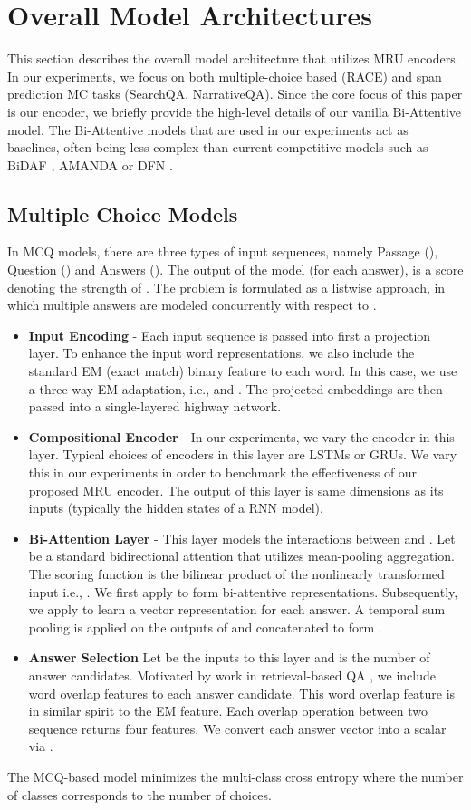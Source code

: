 \documentclass{article}
\begin{document}
\section{Overall Model Architectures}
This section describes the overall model architecture that utilizes \textsc{MRU} encoders. In our experiments, we focus on both multiple-choice based (RACE) and span prediction MC tasks (SearchQA, NarrativeQA). Since the core focus of this paper is our encoder, we briefly provide the high-level details of our vanilla Bi-Attentive model. The Bi-Attentive models that are used in our experiments act as baselines, often being less complex than current competitive models such as BiDAF \cite{seo2016bidirectional}, AMANDA \cite{kundu2018amanda} or DFN \cite{xu2017towards}. 

\subsection{Multiple Choice Models}
In MCQ models, there are three types of input sequences, namely Passage (), Question () and Answers (). The output of the model (for each answer), is a score  denoting the strength of . The problem is formulated as a listwise approach, in which multiple answers are modeled concurrently with respect to . 

\begin{itemize}
\item \textbf{Input Encoding} - Each input sequence is passed into first a projection layer. To enhance the input word representations, we also include the standard EM (exact match) binary feature to each word. In this case, we use a three-way EM adaptation, i.e.,   and . The projected embeddings are then passed into a single-layered highway network. 
\item \textbf{Compositional Encoder} - In our experiments, we vary the encoder in this layer. Typical choices of encoders in this layer are LSTMs or GRUs. We vary this in our experiments in order to benchmark the effectiveness of our proposed MRU encoder. The output of this layer is same dimensions as its inputs (typically the hidden states of a RNN model). 
\item \textbf{Bi-Attention Layer} - This layer models the interactions between  and . Let  be a standard bidirectional attention that utilizes mean-pooling aggregation. The scoring function is the bilinear product of the nonlinearly transformed input i.e., . We first apply  to form bi-attentive  representations. Subsequently, we apply  to learn a vector representation for each answer. A temporal sum pooling is applied on the outputs of  and concatenated to form .  
\item \textbf{Answer Selection}
Let  be the inputs to this layer and  is the number of answer candidates. Motivated by work in retrieval-based QA \cite{DBLP:conf/sigir/SeverynM15,DBLP:conf/sigir/TayPLH17}, we include word overlap features to each answer candidate. This word overlap feature is in similar spirit to the EM feature. Each overlap operation between two sequence returns four features.  We convert each answer vector  into a scalar via . 
\end{itemize}
The MCQ-based model minimizes the multi-class cross entropy where the number of classes corresponds to the number of choices. 
\end{document}

